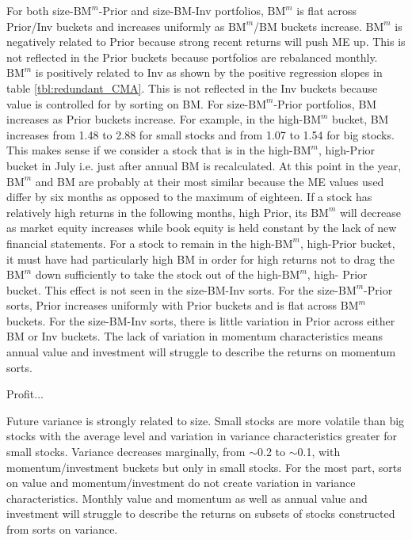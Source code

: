 For both size-$\text{BM}^m$-Prior and size-BM-Inv portfolios, $\text{BM}^m$ is
flat across Prior/Inv buckets and increases uniformly as $\text{BM}^m$/BM
buckets increase. $\text{BM}^m$ is negatively related to Prior because strong
recent returns will push ME up. This is not reflected in the Prior buckets
because portfolios are rebalanced monthly. $\text{BM}^m$ is positively related
to Inv as shown by the positive regression slopes in table
\ref{tbl:redundant_CMA}. This is not reflected in the Inv buckets because value
is controlled for by sorting on BM. For size-$\text{BM}^m$-Prior portfolios, BM
increases as Prior buckets increase. For example, in the high-$\text{BM}^m$
bucket, BM increases from 1.48 to 2.88 for small stocks and from 1.07 to 1.54
for big stocks. This makes sense if we consider a stock that is in the
high-$\text{BM}^m$, high-Prior bucket in July i.e. just after annual BM is
recalculated. At this point in the year, $\text{BM}^m$ and BM are probably at
their most similar because the ME values
used differ by six months as opposed to the
maximum of eighteen. If a stock has relatively high returns in the following
months, high Prior, its $\text{BM}^m$ will decrease as market equity increases
while book equity is held constant by the lack of new financial statements. For
a stock to remain in the high-$\text{BM}^m$, high-Prior bucket, it must have
had particularly high BM in order for high returns not to drag the
$\text{BM}^m$ down sufficiently to take the stock out of the
high-$\text{BM}^m$, high- Prior bucket. This effect is not seen in the
size-BM-Inv sorts.
For the size-$\text{BM}^m$-Prior sorts, Prior increases uniformly
with Prior buckets and is flat across $\text{BM}^m$ buckets.
For the size-BM-Inv sorts, there is little variation in Prior across either
BM or Inv buckets.
The lack of variation in momentum characteristics means annual value and
investment will struggle to describe the returns on momentum
sorts.

Profit...

Future variance is strongly related to size. Small stocks are more volatile
than big stocks with the average level and variation in variance
characteristics greater for small stocks. Variance decreases marginally, from
$\sim$0.2 to $\sim$0.1, with momentum/investment buckets but only in small
stocks. For the most part, sorts on value and momentum/investment do not create
variation in variance characteristics. Monthly value and momentum as well as
annual value and investment will struggle to describe the returns on subsets of
stocks constructed from sorts on variance.

